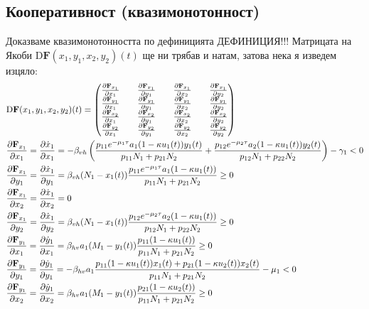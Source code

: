\subsection{Кооперативност (квазимонотонност)}
Доказваме квазимонотонността по дефиницията \color{Red} ДЕФИНИЦИЯ!!!
\color{Black}
Матрицата на Якоби $\mathrm{D} \mathbf{F}(x_1, y_1, x_2, y_2)(t)$ ще ни трябав и натам, затова нека я изведем изцяло:
\begin{align*}
  &\mathrm{D} \mathbf{F}(x_1, y_1, x_2, y_2)(t) =
  \begin{pmatrix}
    \pdv{\mathbf{F}_{x_1}}{x_1} && \pdv{\mathbf{F}_{x_1}}{y_1} && \pdv{\mathbf{F}_{x_1}}{x_2} && \pdv{\mathbf{F}_{x_1}}{y_2} \\
    \pdv{\mathbf{F}_{y_1}}{x_1} && \pdv{\mathbf{F}_{y_1}}{y_1} && \pdv{\mathbf{F}_{y_1}}{x_2} && \pdv{\mathbf{F}_{y_1}}{y_2} \\
    \pdv{\mathbf{F}_{x_2}}{x_1} && \pdv{\mathbf{F}_{x_2}}{y_1} && \pdv{\mathbf{F}_{x_2}}{x_2} && \pdv{\mathbf{F}_{x_2}}{y_2} \\
    \pdv{\mathbf{F}_{y_2}}{x_1} && \pdv{\mathbf{F}_{y_2}}{y_1} && \pdv{\mathbf{F}_{y_2}}{x_2} && \pdv{\mathbf{F}_{y_2}}{y_2}
  \end{pmatrix} \\
  &\pdv{\mathbf{F}_{x_1}}{x_1} = \pdv{\dot{x}_1}{x_1} = -\beta_{vh} \left(\frac{p_{11} e^{-\mu_1 \tau} a_1 (1-\kappa u_1(t)) y_1(t)}{p_{11} N_1 + p_{21} N_2} + \frac{p_{12} e^{-\mu_2 \tau} a_2 (1-\kappa u_1(t)) y_2(t)}{p_{12} N_1 + p_{22} N_2}\right) - \gamma_1 < 0 \\
  &\pdv{\mathbf{F}_{x_1}}{y_1} = \pdv{\dot{x}_1}{y_1} = \beta_{vh} (N_1-x_1(t)) \frac{p_{11} e^{-\mu_1 \tau} a_1 (1-\kappa u_1(t))}{p_{11} N_1 + p_{21} N_2} \geq 0 \\
  &\pdv{\mathbf{F}_{x_1}}{x_2} = \pdv{\dot{x}_1}{x_2} = 0 \\
  &\pdv{\mathbf{F}_{x_1}}{y_2} = \pdv{\dot{x}_1}{y_2} = \beta_{vh} (N_1-x_1(t))\frac{p_{12} e^{-\mu_2 \tau} a_2 (1-\kappa u_1(t))}{p_{12} N_1 + p_{22} N_2} \geq 0 \\
  &\pdv{\mathbf{F}_{y_1}}{x_1} = \pdv{\dot{y}_1}{x_1} = \beta_{hv} a_1 (M_1-y_1(t)) \frac{p_{11} (1-\kappa u_1(t))}{p_{11} N_1 + p_{21} N_2} \geq 0 \\
  &\pdv{\mathbf{F}_{y_1}}{y_1} = \pdv{\dot{y}_1}{y_1} = -\beta_{hv} a_1 \frac{p_{11} (1-\kappa u_1(t)) x_1(t) + p_{21} (1-\kappa u_2(t)) x_2(t)}{p_{11} N_1 + p_{21} N_2} - \mu_1 < 0 \\
  &\pdv{\mathbf{F}_{y_1}}{x_2} = \pdv{\dot{y}_1}{x_2} = \beta_{hv} a_1 (M_1-y_1(t)) \frac{p_{21} (1-\kappa u_2(t))}{p_{11} N_1 + p_{21} N_2} \geq 0 \\

\end{align*}
